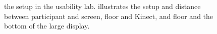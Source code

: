 \begin{figure}[H]
\caption{\protect{} the setup in the usability lab. \protect{} illustrates the setup and distance between participant and screen, floor and Kinect, and floor and the bottom of the large display.}
\end{figure}

